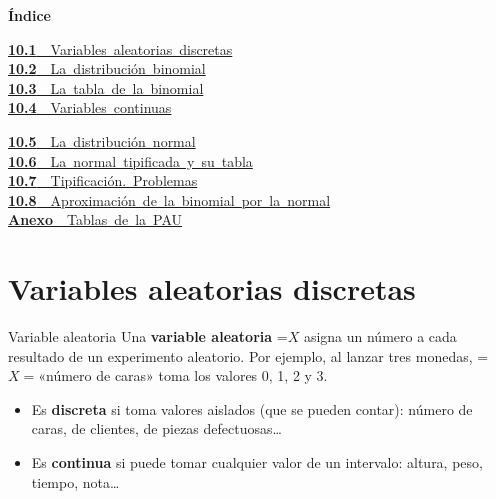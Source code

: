 \documentclass[11pt,a4paper]{article}
\newcommand{\fmm}[1]{\setbox0=\hbox{$#1$}\ifdim\wd0>\linewidth\[#1\]\else\mbox{\box0}\fi}
\begin{document}
\begin{tcolorbox}[colback=fmsurface,colframe=fmsurface,arc=3mm,left=4mm,right=4mm,top=2mm,bottom=2mm]
\small\textbf{Índice}\par\smallskip
\begin{minipage}[t]{0.42\linewidth}\small \mbox{\hyperlink{sec1}{\textbf{\color{fmgreen}10.1}\ \ Variables aleatorias discretas}}\\[3pt]
\mbox{\hyperlink{sec2}{\textbf{\color{fmgreen}10.2}\ \ La distribución binomial}}\\[3pt]
\mbox{\hyperlink{sec3}{\textbf{\color{fmgreen}10.3}\ \ La tabla de la binomial}}\\[3pt]
\mbox{\hyperlink{sec4}{\textbf{\color{fmgreen}10.4}\ \ Variables continuas}}\\[3pt]\end{minipage}\hfill\begin{minipage}[t]{0.56\linewidth}\small \mbox{\hyperlink{sec5}{\textbf{\color{fmgreen}10.5}\ \ La distribución normal}}\\[3pt]
\mbox{\hyperlink{sec6}{\textbf{\color{fmgreen}10.6}\ \ La normal tipificada y su tabla}}\\[3pt]
\mbox{\hyperlink{sec7}{\textbf{\color{fmgreen}10.7}\ \ Tipificación. Problemas}}\\[3pt]
\mbox{\hyperlink{sec8}{\textbf{\color{fmgreen}10.8}\ \ Aproximación de la binomial por la normal}}\\[3pt]
\mbox{\hyperlink{annex}{\textbf{\color{fmgreen}Anexo}\ \ Tablas de la PAU}}\\[3pt]\end{minipage}
\end{tcolorbox}

\section{Variables aleatorias discretas}\hypertarget{sec1}{}

  

  
\begin{fmdef}{Variable aleatoria}
Una \textbf{variable aleatoria} \fmm{X} asigna un número a cada resultado de un experimento aleatorio. Por ejemplo, al lanzar tres monedas, \fmm{X=}«número de caras» toma los valores 0, 1, 2 y 3.

      
\begin{itemize}
\item Es \textbf{discreta} si toma valores aislados (que se pueden contar): número de caras, de clientes, de piezas defectuosas\dots{}
\item Es \textbf{continua} si puede tomar cualquier valor de un intervalo: altura, peso, tiempo, nota\dots{}
\end{itemize}
\end{fmdef}
\end{document}
